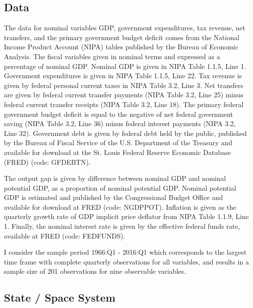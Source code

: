 \documentclass[11pt]{article}
\begin{document}
\subsection{Data}
The data for nominal variables GDP, government expenditures, tax revenue, net transfers, and the primary government budget deficit comes from the National Income Product Account (NIPA) tables published by the Bureau of Economic Analysis.  The fiscal variables given in nominal terms and expressed as a percentage of nominal GDP.  Nominal GDP is given in NIPA Table 1.1.5, Line 1.  Government expenditures is given in NIPA Table 1.1.5, Line 22.  Tax revenue is given by federal personal current taxes in NIPA Table 3.2, Line 3.  Net transfers are given by federal current transfer payments (NIPA Table 3.2, Line 25) minus federal current transfer receipts (NIPA Table 3.2, Line 18).  The primary federal government budget deficit is equal to the negative of net federal government saving (NIPA Table 3.2, Line 36) minus federal interest payments (NIPA 3.2, Line 32).  Government debt is given by federal debt held by the public, published by the Bureau of Fiscal Service of the U.S. Department of the Treasury and available for download at the St. Louis Federal Reserve Economic Database (FRED) (code: GFDEBTN).

The output gap is given by difference between nominal GDP and nominal potential GDP, as a proportion of nominal potential GDP.  Nominal potential GDP is estimated and published by the Congressional Budget Office and available for download at FRED (code: NGDPPOT).  Inflation is given as the quarterly growth rate of GDP implicit price deflator from NIPA Table 1.1.9, Line 1.  Finally, the nominal interest rate is given by the effective federal funds rate, available at FRED (code: FEDFUNDS).

I consider the sample period 1966:Q1 - 2016:Q1 which corresponds to the largest time frame with complete quarterly observations for all variables, and results in a sample size of 201 observations for nine observable variables.

\subsection{State / Space System}
\end{document}
